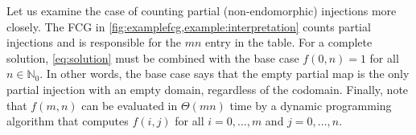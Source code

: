 \documentclass[letterpaper]{article} %
\theoremstyle{definition}
\theoremstyle{remark}
\begin{document}
Let us examine the case of counting partial (non-endomorphic) injections more
closely. The FCG in \cref{fig:examplefcg,example:interpretation} counts partial
injections and is responsible for the $mn$ entry in the table. For a complete
solution, \cref{eq:solution} must be combined with the base case $f(0, n) = 1$
for all $n \in \mathbb{N}_{0}$. In other words, the base case says that the
empty partial map is the only partial injection with an empty domain, regardless
of the codomain. Finally, note that $f(m, n)$ can be evaluated in $\Theta(mn)$
time by a dynamic programming algorithm that computes $f(i, j)$ for all
$i = 0, \dots, m$ and $j = 0, \dots, n$.


\end{document}
